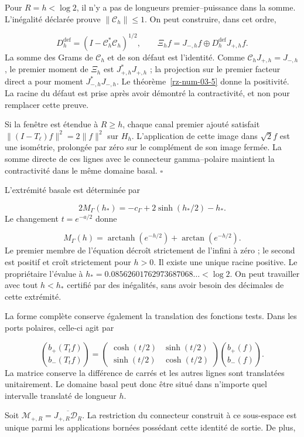 Pour \(R=h<\log2\), il n’y a pas de longueurs premier–puissance dans la somme. L’inégalité déclarée prouve \(\|\mathcal C_h\|\leq1\). On peut construire, dans cet ordre,

\[
D_h^{\mathrm{def}}=(I-\mathcal C_h^*\mathcal C_h)^{1/2},
\qquad
\Xi_hf=J_{-,h}f\oplus D_h^{\mathrm{def}}J_{+,h}f.
\]
La somme des Grams de \(\mathcal C_h\) et de son défaut est l’identité. Comme \(\mathcal C_hJ_{+,h}=J_{-,h}\), le premier moment de \(\Xi_h\) est \(J_{+,h}^*J_{+,h}\) ; la projection sur le premier facteur direct a pour moment \(J_{-,h}^*J_{-,h}\). Le théorème~\ref{rz-num-03-5} donne la positivité. La racine du défaut est prise après avoir démontré la contractivité, et non pour remplacer cette preuve.

Si la fenêtre est étendue à \(R\geq h\), chaque canal premier ajouté satisfait \(\|(I-T_\ell)f\|^2=2\|f\|^2\) sur \(H_h\). L'application de cette image dans \(\sqrt2f\) est une isométrie, prolongée par zéro sur le complément de son image fermée. La somme directe de ces lignes avec le connecteur gamma–polaire maintient la contractivité dans le même domaine basal. \hfill\(\square\)

L’extrémité basale est déterminée par

\[
2M_\Gamma(h_*)=-c_\Gamma+2\sinh(h_*/2)-h_*.
\]
Le changement \(t=e^{-a/2}\) donne

\[
M_\Gamma(h)=\operatorname{arctanh}(e^{-h/2})
+\arctan(e^{-h/2}).
\]
Le premier membre de l’équation décroît strictement de l’infini à zéro ; le second est positif et croît strictement pour \(h>0\). Il existe une unique racine positive. Le propriétaire l’évalue à \(h_*=0.08562601762973687068\ldots<\log2\). On peut travailler avec tout \(h<h_*\) certifié par des inégalités, sans avoir besoin des décimales de cette extrémité.

La forme complète conserve également la translation des fonctions tests. Dans les ports polaires, celle-ci agit par

\[
\binom{b_+(T_tf)}{b_-(T_tf)}=
\begin{pmatrix}\cosh(t/2)&\sinh(t/2)\\
\sinh(t/2)&\cosh(t/2)\end{pmatrix}
\binom{b_+(f)}{b_-(f)}.
\]
La matrice conserve la différence de carrés et les autres lignes sont translatées unitairement. Le domaine basal peut donc être situé dans n'importe quel intervalle translaté de longueur \(h\).

Soit \(\mathcal M_{+,R}=\overline{J_{+,R}\mathcal D_R}\). La restriction du connecteur construit à ce sous-espace est unique parmi les applications bornées possédant cette identité de sortie. De plus,

